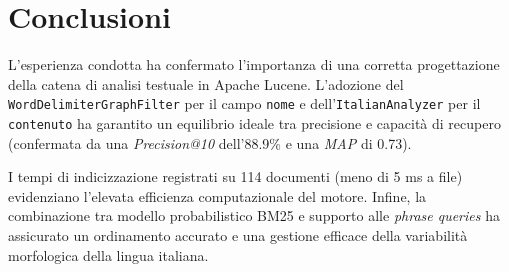 \documentclass[11pt,a4paper]{article}
\begin{document}
\section{Conclusioni}
L'esperienza condotta ha confermato l'importanza di una corretta progettazione della catena di analisi testuale in Apache Lucene. L'adozione del \texttt{WordDelimiterGraphFilter} per il campo \texttt{nome} e dell'\texttt{ItalianAnalyzer} per il \texttt{contenuto} ha garantito un equilibrio ideale tra precisione e capacità di recupero (confermata da una \textit{Precision@10} dell'88.9\% e una \textit{MAP} di 0.73).

I tempi di indicizzazione registrati su 114 documenti (meno di 5 ms a file) evidenziano l'elevata efficienza computazionale del motore. Infine, la combinazione tra modello probabilistico BM25 e supporto alle \textit{phrase queries} ha assicurato un ordinamento accurato e una gestione efficace della variabilità morfologica della lingua italiana.
\end{document}
